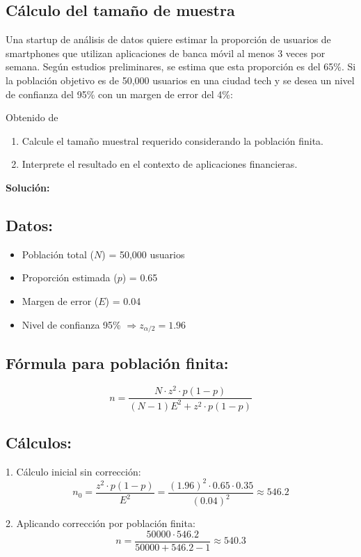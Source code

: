 \subsection{Cálculo del tamaño de muestra}

Una startup de análisis de datos quiere estimar la proporción de usuarios de smartphones que utilizan aplicaciones de banca móvil al menos 3 veces por semana. Según estudios preliminares, se estima que esta proporción es del 65\%. Si la población objetivo es de 50,000 usuarios en una ciudad tech y se desea un nivel de confianza del 95\% con un margen de error del 4\%: 

Obtenido de \cite{DiazRodriguez}

\begin{enumerate}
    \item Calcule el tamaño muestral requerido considerando la población finita.
    \item Interprete el resultado en el contexto de aplicaciones financieras.
\end{enumerate}

\textbf{Solución:}

\subsection*{Datos:}
\begin{itemize}
    \item Población total ($N$) = 50,000 usuarios
    \item Proporción estimada ($p$) = 0.65
    \item Margen de error ($E$) = 0.04
    \item Nivel de confianza 95\% $\Rightarrow z_{\alpha/2} = 1.96$
\end{itemize}

\subsection*{Fórmula para población finita:}
\[ n = \frac{N \cdot z^2 \cdot p(1-p)}{(N-1)E^2 + z^2 \cdot p(1-p)} \]

\subsection*{Cálculos:}
1. Cálculo inicial sin corrección:
\[ n_0 = \frac{z^2 \cdot p(1-p)}{E^2} = \frac{(1.96)^2 \cdot 0.65 \cdot 0.35}{(0.04)^2} \approx 546.2 \]

2. Aplicando corrección por población finita:
\[ n = \frac{50000 \cdot 546.2}{50000 + 546.2 - 1} \approx 540.3 \]

